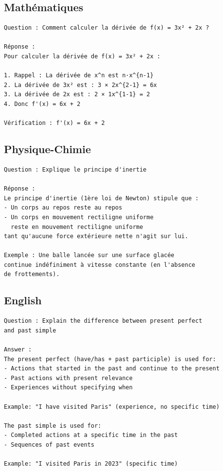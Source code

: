 \documentclass[12pt,a4paper]{report}
\begin{document}
\subsection{Mathématiques}
\begin{verbatim}
Question : Comment calculer la dérivée de f(x) = 3x² + 2x ?

Réponse :
Pour calculer la dérivée de f(x) = 3x² + 2x :

1. Rappel : La dérivée de x^n est n·x^{n-1}
2. La dérivée de 3x² est : 3 × 2x^{2-1} = 6x
3. La dérivée de 2x est : 2 × 1x^{1-1} = 2
4. Donc f'(x) = 6x + 2

Vérification : f'(x) = 6x + 2
\end{verbatim}

\subsection{Physique-Chimie}
\begin{verbatim}
Question : Explique le principe d'inertie

Réponse :
Le principe d'inertie (1ère loi de Newton) stipule que :
- Un corps au repos reste au repos
- Un corps en mouvement rectiligne uniforme 
  reste en mouvement rectiligne uniforme
tant qu'aucune force extérieure nette n'agit sur lui.

Exemple : Une balle lancée sur une surface glacée 
continue indéfiniment à vitesse constante (en l'absence 
de frottements).
\end{verbatim}

\subsection{English}
\begin{verbatim}
Question : Explain the difference between present perfect 
and past simple

Answer :
The present perfect (have/has + past participle) is used for:
- Actions that started in the past and continue to the present
- Past actions with present relevance
- Experiences without specifying when

Example: "I have visited Paris" (experience, no specific time)

The past simple is used for:
- Completed actions at a specific time in the past
- Sequences of past events

Example: "I visited Paris in 2023" (specific time)
\end{verbatim}
\end{document}
